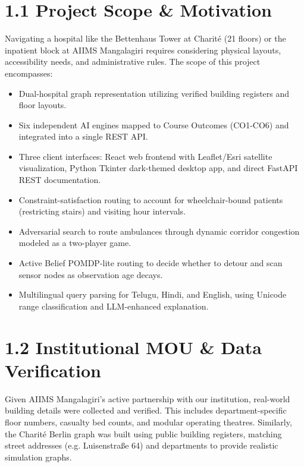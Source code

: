 \documentclass[12pt,a4paper]{report}
\begin{document}
\section{1.1 Project Scope \& Motivation}

Navigating a hospital like the Bettenhaus Tower at Charit\'{e} (21 floors) or the inpatient block at AIIMS Mangalagiri requires considering physical layouts, accessibility needs, and administrative rules. The scope of this project encompasses:

\begin{itemize}
\item \textbullet{} Dual-hospital graph representation utilizing verified building registers and floor layouts.
\item \textbullet{} Six independent AI engines mapped to Course Outcomes (CO1-CO6) and integrated into a single REST API.
\item \textbullet{} Three client interfaces: React web frontend with Leaflet/Esri satellite visualization, Python Tkinter dark-themed desktop app, and direct FastAPI REST documentation.
\item \textbullet{} Constraint-satisfaction routing to account for wheelchair-bound patients (restricting stairs) and visiting hour intervals.
\item \textbullet{} Adversarial search to route ambulances through dynamic corridor congestion modeled as a two-player game.
\item \textbullet{} Active Belief POMDP-lite routing to decide whether to detour and scan sensor nodes as observation age decays.
\item \textbullet{} Multilingual query parsing for Telugu, Hindi, and English, using Unicode range classification and LLM-enhanced explanation.
\end{itemize}


\section{1.2 Institutional MOU \& Data Verification}

Given AIIMS Mangalagiri's active partnership with our institution, real-world building details were collected and verified. This includes department-specific floor numbers, casualty bed counts, and modular operating theatres. Similarly, the Charit\'{e} Berlin graph was built using public building registers, matching street addresses (e.g. Luisenstraße 64) and departments to provide realistic simulation graphs.
\end{document}

